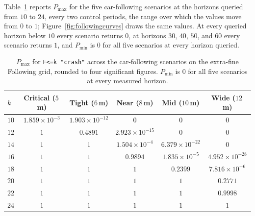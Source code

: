 \documentclass[11pt,a4paper]{article}
\newcommand{\code}[1]{\texttt{\small #1}}
\theoremstyle{plain}
\theoremstyle{remark}
\begin{document}
	Table~\ref{tab:followingresults} reports $P_{\max}$ for the five car-following scenarios at the horizons queried from $10$ to $24$, every two control periods, the range over which the values move from $0$ to $1$; Figure~\ref{fig:followingcurves} draws the same values. At every queried horizon below $10$ every scenario returns $0$, at horizons $30$, $40$, $50$, and $60$ every scenario returns $1$, and $P_{\min}$ is $0$ for all five scenarios at every horizon queried.
	
	\begin{table}[H]
		\centering
		\begin{tabular}{lccccc}
			\toprule
			$k$ & Critical ($5$\,m) & Tight ($6$\,m) & Near ($8$\,m) & Mid ($10$\,m) & Wide ($12$\,m) \\
			\midrule
			$10$ & $1.859 \times 10^{-3}$ & $1.903 \times 10^{-12}$ & $0$ & $0$ & $0$ \\
			$12$ & $1$ & $0.4891$ & $2.923 \times 10^{-15}$ & $0$ & $0$ \\
			$14$ & $1$ & $1$ & $1.504 \times 10^{-4}$ & $6.379 \times 10^{-22}$ & $0$ \\
			$16$ & $1$ & $1$ & $0.9894$ & $1.835 \times 10^{-5}$ & $4.952 \times 10^{-28}$ \\
			$18$ & $1$ & $1$ & $1$ & $0.2399$ & $7.816 \times 10^{-6}$ \\
			$20$ & $1$ & $1$ & $1$ & $1$ & $0.2771$ \\
			$22$ & $1$ & $1$ & $1$ & $1$ & $0.9998$ \\
			$24$ & $1$ & $1$ & $1$ & $1$ & $1$ \\
			\bottomrule
		\end{tabular}
		\caption{$P_{\max}$ for \code{F<=k "crash"} across the car-following scenarios on the extra-fine Following grid, rounded to four significant figures. $P_{\min}$ is $0$ for all five scenarios at every measured horizon.}
		\label{tab:followingresults}
	\end{table}
	
\end{document}

